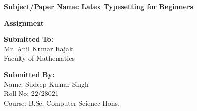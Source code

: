 \begin{titlepage}
    \vspace{2cm}

    {\Large \textbf{Subject/Paper Name: Latex Typesetting for Beginners}} \\
    \vspace{0.5cm}
    
    {\Large \textbf{Assignment}} \\
    \vspace{1.5cm}
    \vspace*{\fill}
    \begin{flushleft}
       {\large { \textbf{Submitted To:}} \\
        \vspace{0.5cm}
        Mr. Anil Kumar Rajak \\
        \vspace{0.3cm}
        Faculty of Mathematics \\
        \vspace{1cm}

        { \textbf{Submitted By:}} \\
        \vspace{0.5cm}
        Name: Sudeep Kumar Singh \\
        \vspace{0.3cm}
        Roll No: 22/28021 \\
        \vspace{0.3cm}
        Course: B.Sc. Computer Science Hons. \\
        \vspace{1cm}}
    \end{flushleft}

    \vspace{1cm}
\end{titlepage}